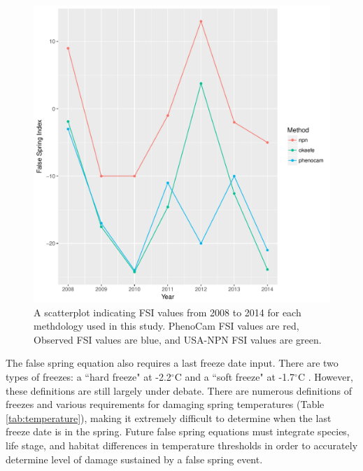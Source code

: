 \documentclass{article}\usepackage[]{graphicx}\usepackage[]{color}
\makeatletter
\def\maxwidth{ %
  \ifdim\Gin@nat@width>\linewidth
    \linewidth
  \else
    \Gin@nat@width
  \fi
}
\makeatother
\begin{document}
\begin{figure}[H]
\includegraphics[width=\maxwidth]{figure/fsifig-1} \caption[A scatterplot indicating FSI values from 2008 to 2014 for each methdology used in this study]{A scatterplot indicating FSI values from 2008 to 2014 for each methdology used in this study. PhenoCam FSI values are red, Observed FSI values are blue, and USA-NPN FSI values are green.}\label{fig:fsifig}
\end{figure}




The false spring equation also requires a last freeze date input. There are two types of freezes: a ``hard freeze" at -2.2$^{\circ}$C and a ``soft freeze" at -1.7$^{\circ}$C \citep{Vavrus2006, Kodra2011, Augspurger2013}. However, these definitions are still largely under debate. There are numerous definitions of freezes and various requirements for damaging spring temperatures (Table \ref{tab:temperature}), making it extremely difficult to determine when the last freeze date is in the spring. Future false spring equations must integrate species, life stage, and habitat differences in temperature thresholds in order to accurately determine level of damage sustained by a false spring event.
 
\end{document}
